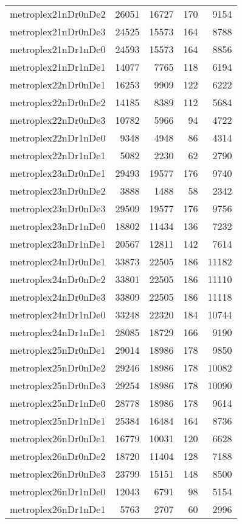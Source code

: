 \begin{longtable}{lrrrr}
metroplex21nDr0nDe2 & 26051 & 16727 & 170 & 9154 \\
metroplex21nDr0nDe3 & 24525 & 15573 & 164 & 8788 \\
metroplex21nDr1nDe0 & 24593 & 15573 & 164 & 8856 \\
metroplex21nDr1nDe1 & 14077 & 7765 & 118 & 6194 \\
metroplex22nDr0nDe1 & 16253 & 9909 & 122 & 6222 \\
metroplex22nDr0nDe2 & 14185 & 8389 & 112 & 5684 \\
metroplex22nDr0nDe3 & 10782 & 5966 & 94 & 4722 \\
metroplex22nDr1nDe0 & 9348 & 4948 & 86 & 4314 \\
metroplex22nDr1nDe1 & 5082 & 2230 & 62 & 2790 \\
metroplex23nDr0nDe1 & 29493 & 19577 & 176 & 9740 \\
metroplex23nDr0nDe2 & 3888 & 1488 & 58 & 2342 \\
metroplex23nDr0nDe3 & 29509 & 19577 & 176 & 9756 \\
metroplex23nDr1nDe0 & 18802 & 11434 & 136 & 7232 \\
metroplex23nDr1nDe1 & 20567 & 12811 & 142 & 7614 \\
metroplex24nDr0nDe1 & 33873 & 22505 & 186 & 11182 \\
metroplex24nDr0nDe2 & 33801 & 22505 & 186 & 11110 \\
metroplex24nDr0nDe3 & 33809 & 22505 & 186 & 11118 \\
metroplex24nDr1nDe0 & 33248 & 22320 & 184 & 10744 \\
metroplex24nDr1nDe1 & 28085 & 18729 & 166 & 9190 \\
metroplex25nDr0nDe1 & 29014 & 18986 & 178 & 9850 \\
metroplex25nDr0nDe2 & 29246 & 18986 & 178 & 10082 \\
metroplex25nDr0nDe3 & 29254 & 18986 & 178 & 10090 \\
metroplex25nDr1nDe0 & 28778 & 18986 & 178 & 9614 \\
metroplex25nDr1nDe1 & 25384 & 16484 & 164 & 8736 \\
metroplex26nDr0nDe1 & 16779 & 10031 & 120 & 6628 \\
metroplex26nDr0nDe2 & 18720 & 11404 & 128 & 7188 \\
metroplex26nDr0nDe3 & 23799 & 15151 & 148 & 8500 \\
metroplex26nDr1nDe0 & 12043 & 6791 & 98 & 5154 \\
metroplex26nDr1nDe1 & 5763 & 2707 & 60 & 2996 \\

\end{longtable}
